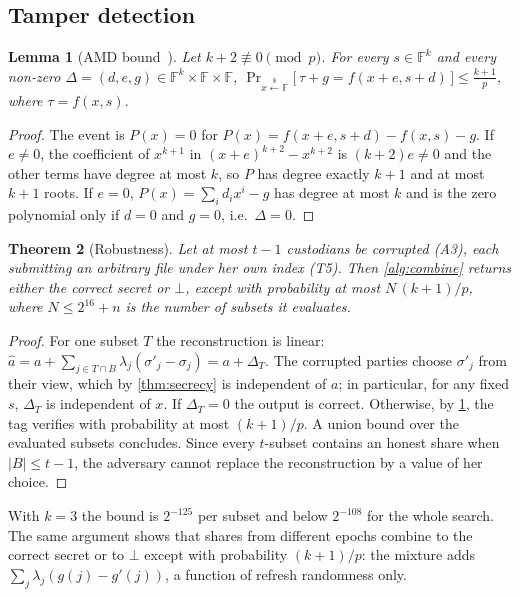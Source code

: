\documentclass[10.5pt,a4paper]{article}
\theoremstyle{plain}
\newtheorem{theorem}{Theorem}
\newtheorem{lemma}[theorem]{Lemma}
\theoremstyle{definition}
\newcommand{\F}{\mathbb{F}}
\newcommand{\getsr}{\xleftarrow{\$}}
\begin{document}
\subsection{Tamper detection}

\begin{lemma}[AMD bound~\cite{cramer08}]\label{lem:amd}
Let $k+2\not\equiv0\pmod p$. For every $s\in\F^k$ and every non-zero $\Delta=(d,e,g)\in\F^k\times\F\times\F$,
$\Pr_{x\getsr\F}\big[\,\tau+g=f(x+e,s+d)\,\big]\le\frac{k+1}{p}$, where $\tau=f(x,s)$.
\end{lemma}
\begin{proof}
The event is $P(x)=0$ for $P(x)=f(x+e,s+d)-f(x,s)-g$. If $e\neq0$, the coefficient of $x^{k+1}$ in $(x+e)^{k+2}-x^{k+2}$ is $(k+2)e\neq0$ and the other terms have degree at most $k$, so $P$ has degree exactly $k+1$ and at most $k+1$ roots. If $e=0$, $P(x)=\sum_i d_ix^i-g$ has degree at most $k$ and is the zero polynomial only if $d=0$ and $g=0$, i.e.\ $\Delta=0$.
\end{proof}

\begin{theorem}[Robustness]\label{thm:robust}
Let at most $t-1$ custodians be corrupted (A3), each submitting an arbitrary file under her own index (T5). Then \cref{alg:combine} returns either the correct secret or $\bot$, except with probability at most $N\,(k+1)/p$, where $N\le 2^{16}+n$ is the number of subsets it evaluates.
\end{theorem}
\begin{proof}
For one subset $T$ the reconstruction is linear: $\hat a=a+\sum_{j\in T\cap B}\lambda_j(\sigma'_j-\sigma_j)=a+\Delta_T$. The corrupted parties choose $\sigma'_j$ from their view, which by \cref{thm:secrecy} is independent of $a$; in particular, for any fixed $s$, $\Delta_T$ is independent of $x$. If $\Delta_T=0$ the output is correct. Otherwise, by \cref{lem:amd}, the tag verifies with probability at most $(k+1)/p$. A union bound over the evaluated subsets concludes. Since every $t$-subset contains an honest share when $|B|\le t-1$, the adversary cannot replace the reconstruction by a value of her choice.
\end{proof}

With $k=3$ the bound is $2^{-125}$ per subset and below $2^{-108}$ for the whole search. The same argument shows that shares from different epochs combine to the correct secret or to $\bot$ except with probability $(k+1)/p$: the mixture adds $\sum_j\lambda_j(g(j)-g'(j))$, a function of refresh randomness only.
\end{document}
